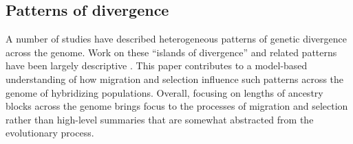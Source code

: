 \documentclass[11pt,letterpaper]{article}
\newcommand{\alisa}[1]{{\em \color{red} #1}}
\newcommand{\plr}[1]{{\em \color{blue} #1}}
\newcommand{\yb}[1]{{\em \color{magenta} #1}}
\begin{document}





\subsection*{Patterns of divergence}  
A number of studies have described heterogeneous patterns of genetic divergence across the genome. 
Work on these ``islands of divergence'' \citep{turner2005genomic,Nosil2009} and related patterns have been largely descriptive \citep{Cruickshank2014,Noor2009}.
This paper contributes to a model-based understanding of 
how migration and selection influence such patterns across the genome of hybridizing populations. 
Overall, focusing on lengths of ancestry blocks across the genome brings focus to the processes of migration and selection 
rather than high-level summaries that are somewhat abstracted from the evolutionary process. 



\end{document}
